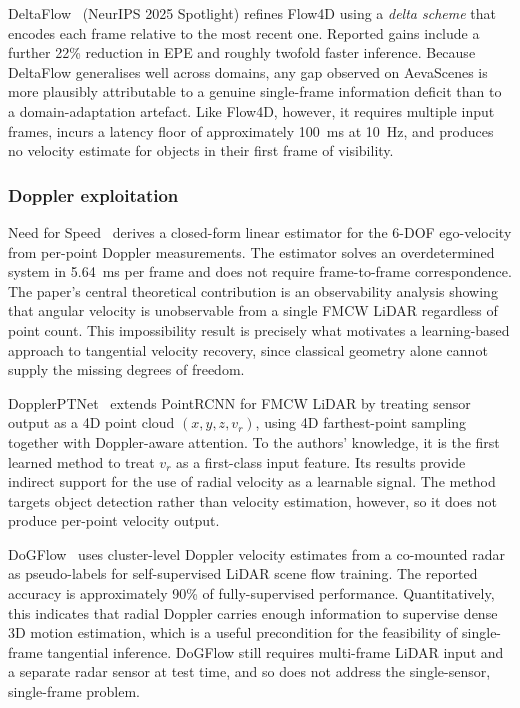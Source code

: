 \documentclass[a4paper,12pt]{article}
\begin{document}
DeltaFlow~\cite{zhang2025deltaflow} (NeurIPS 2025 Spotlight) refines Flow4D using a \textit{delta scheme} that encodes each frame relative to the most recent one. Reported gains include a further 22\% reduction in EPE and roughly twofold faster inference. Because DeltaFlow generalises well across domains, any gap observed on AevaScenes is more plausibly attributable to a genuine single-frame information deficit than to a domain-adaptation artefact. Like Flow4D, however, it requires multiple input frames, incurs a latency floor of approximately 100~ms at 10~Hz, and produces no velocity estimate for objects in their first frame of visibility.

\subsubsection{Doppler exploitation}

Need for Speed~\cite{yoon2023needforspeed} derives a closed-form linear estimator for the 6-DOF ego-velocity from per-point Doppler measurements. The estimator solves an overdetermined system in 5.64~ms per frame and does not require frame-to-frame correspondence. The paper's central theoretical contribution is an observability analysis showing that angular velocity is unobservable from a single FMCW LiDAR regardless of point count. This impossibility result is precisely what motivates a learning-based approach to tangential velocity recovery, since classical geometry alone cannot supply the missing degrees of freedom.

DopplerPTNet~\cite{dopplerptnet2024} extends PointRCNN for FMCW LiDAR by treating sensor output as a 4D point cloud $(x, y, z, v_r)$, using 4D farthest-point sampling together with Doppler-aware attention. To the authors' knowledge, it is the first learned method to treat $v_r$ as a first-class input feature. Its results provide indirect support for the use of radial velocity as a learnable signal. The method targets object detection rather than velocity estimation, however, so it does not produce per-point velocity output.

DoGFlow~\cite{khoche2026dogflow} uses cluster-level Doppler velocity estimates from a co-mounted radar as pseudo-labels for self-supervised LiDAR scene flow training. The reported accuracy is approximately 90\% of fully-supervised performance. Quantitatively, this indicates that radial Doppler carries enough information to supervise dense 3D motion estimation, which is a useful precondition for the feasibility of single-frame tangential inference. DoGFlow still requires multi-frame LiDAR input and a separate radar sensor at test time, and so does not address the single-sensor, single-frame problem.
\end{document}
